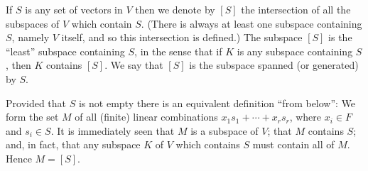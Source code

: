 If $S$ is any set of vectors in $V$ then we denote by $[S]$ the intersection of all the subspaces of $V$ which contain $S$. (There is always at least one subspace containing $S$, namely $V$ itself, and so this intersection is defined.) The subspace $[S]$ is the ``least'' subspace containing $S$, in the sense that if $K$ is any subspace containing $S$, then $K$ contains $[S]$. We say that $[S]$ is the subspace spanned (or generated) by $S$.

Provided that $S$ is not empty there is an equivalent definition ``from below'': We form the set $M$ of all (finite) linear combinations $x_1 s_1 + \cdots + x_r s_r$, where $x_i \in F$ and $s_i \in S$. It is immediately seen that $M$ is a subspace of $V$; that $M$ contains $S$; and, in fact, that any subspace $K$ of $V$ which contains $S$ must contain all of $M$. Hence $M = [S]$.
